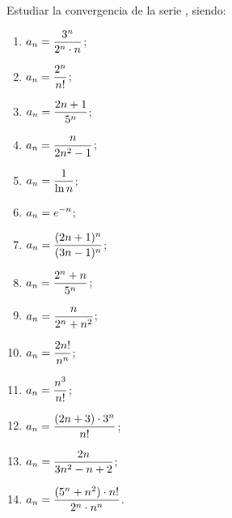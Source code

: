 
\item Estudiar la convergencia de la serie \seriean, siendo:

\begin{multicols}{2}
\begin{enumerate}
\item $\displaystyle a_n = \frac{3^n}{2^n \cdot n}$;
\item $\displaystyle a_n = \frac{2^n}{n!}$;
\item $\displaystyle a_n = \frac{2n+1}{5^n}$;
\item $\displaystyle a_n = \frac{n}{2n^2-1}$;
\item $\displaystyle a_n = \frac1{\ln n}$;
\item $\displaystyle a_n = e^{-n}$;
\item $\displaystyle a_n = \frac{(2n+1)^n}{(3n-1)^n}$;
\item $\displaystyle a_n = \frac{2^n+n}{5^n}$;
\item $\displaystyle a_n = \frac{n}{2^n+n^2}$;
\item $\displaystyle a_n = \frac{2 n!}{n^n}$;
\item $\displaystyle a_n = \frac{n^3}{n!}$;
\item $\displaystyle a_n = \frac{(2n+3)\cdot 3^n}{n!}$;
\item $\displaystyle a_n = \frac{2n}{3n^2-n+2}$;
\item $\displaystyle a_n = \frac{(5^n+n^2) \cdot n!}{2^n \cdot n^n}$.
\end{enumerate}
\end{multicols}
